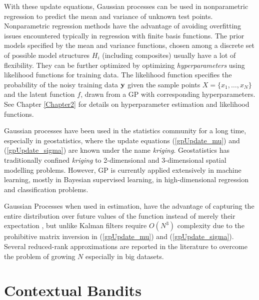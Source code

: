 With these update equations, Gaussian processes can be used in nonparametric regression to predict the mean and variance of unknown test points. Nonparametric regression methods have the advantage of avoiding overfitting issues encountered typically in regression with finite basis functions. The prior models specified by the mean and variance functions, chosen among a discrete set of possible model structures  $\mathit{H_i}$ (including composites) usually have a lot of flexibility. They can be further optimized by optimizing \textit{hyperparameters} using likelihood functions for training data. The likelihood function specifies the probability of the noisy training data $\mathbf{y}$ given the sample points $X = \{x_1,\ldots,x_N\}$ and the latent function $f$, drawn from a GP with corresponding hyperparameters. See Chapter \ref{Chapter2} for details on hyperparameter estimation and likelihood functions.

Gaussian processes have been used in the statistics community for a long time, especially in geostatistics, where the update equations  (\ref{gpUpdate_mu}) and (\ref{gpUpdate_sigma}) are known under the name \textit{kriging}. Geostatistics has traditionally confined \textit{kriging} to 2-dimensional and 3-dimensional spatial modelling problems. However, GP is currently applied extensively in machine learning, mostly in Bayesian supervised learning, in high-dimensional regression and classification problems.

Gaussian Processes when used in estimation, have the advantage of capturing the entire distribution over future values of the function instead of merely their expectation \cite{Rasmussen2}, but unlike Kalman filters require $O(N^3)$ complexity due to the prohibitive matrix inversion in (\ref{gpUpdate_mu}) and (\ref{gpUpdate_sigma}). 
Several reduced-rank approximations are reported in the literature \cite{GPbook} to overcome the problem of growing $N$ especially in big datasets.
%

\section{Contextual Bandits}
\label{ContextBandit}


